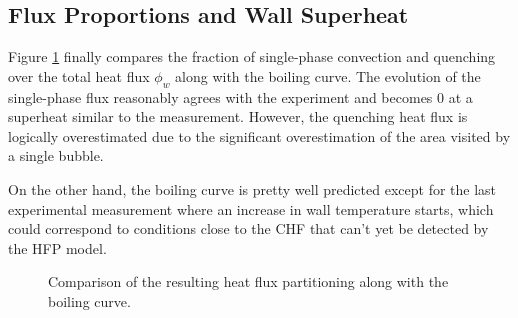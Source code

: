 \clearpage

\subsection{Flux Proportions and Wall Superheat}

Figure \ref{fig:fullkoss_hfp} finally compares the fraction of single-phase convection and quenching over the total heat flux $\phi_{w}$ along with the boiling curve. The evolution of the single-phase flux reasonably agrees with the experiment and becomes 0 at a superheat similar to the measurement. However, the quenching heat flux is logically overestimated due to the significant overestimation of the area visited by a single bubble.

\npar

On the other hand, the boiling curve is pretty well predicted except for the last experimental measurement where an increase in wall temperature starts, which could correspond to conditions close to the CHF that can't yet be detected by the HFP model.

\begin{figure}[!h]
\caption{Comparison of the resulting heat flux partitioning along with the boiling curve.}
\label{fig:fullkoss_hfp}
\end{figure}


